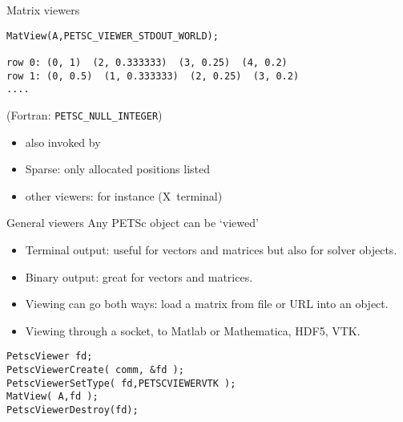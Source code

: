 \begin{details}
\begin{numberedframe}{Matrix viewers}
\begin{lstlisting}
MatView(A,PETSC_VIEWER_STDOUT_WORLD);

row 0: (0, 1)  (2, 0.333333)  (3, 0.25)  (4, 0.2)
row 1: (0, 0.5)  (1, 0.333333)  (2, 0.25)  (3, 0.2)
....
\end{lstlisting}
(Fortran: \lstinline{PETSC_NULL_INTEGER})
  \begin{itemize}
  \item also invoked by 
  \item Sparse: only allocated positions listed
  \item other viewers: for instance  (X~terminal)
  \end{itemize}

\end{numberedframe}

\end{details}

\begin{numberedframe}{General viewers}
  Any PETSc object can be `viewed'
  \begin{itemize}
  \item Terminal output: useful for vectors and matrices but also for
    solver objects.
  \item Binary output: great for vectors and matrices.
  \item Viewing can go both ways: load a matrix from file or URL into
    an object.
  \item Viewing through a socket, to Matlab or Mathematica, HDF5, VTK.
  \end{itemize}
\begin{lstlisting}
PetscViewer fd;
PetscViewerCreate( comm, &fd );
PetscViewerSetType( fd,PETSCVIEWERVTK );
MatView( A,fd );
PetscViewerDestroy(fd);
\end{lstlisting}
\end{numberedframe}



